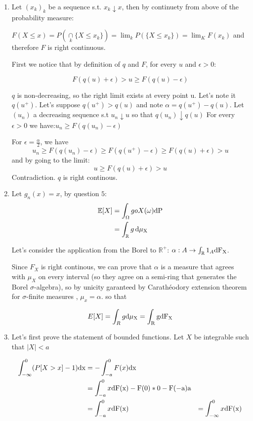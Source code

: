 \documentclass[12pt]{article}
\newcommand{\inter}[1]{\underset{#1}{\cap} }
\begin{document}
\begin{enumerate}
\item Let $(x_k)_k$ be a sequence s.t. $x_k \downarrow x$, then by continuety from above of the probability measure:

$F(X \leq x) = P( \inter{k}\{X \leq x_k\} ) = \lim_k P( \{X \leq x_k\} ) = \lim_K F(x_k)$ and therefore $F$ is right continuous.

First we notice that by definition of $q$ and $F$, for every $u$ and $\epsilon > 0$:

$$F(q(u)+\epsilon) > u \geq F(q(u) - \epsilon)$$

$q$ is non-decreasing, so the right limit exists at every point u. Let's note it $q(u^+)$. 
Let's suppose $q(u^+) > q(u)$ and note $\alpha = q(u^+) - q(u)$.
Let $(u_n)$ a decreasing sequence s.t $u_n \downarrow u$ so that $q(u_n) \downarrow q(u)$
For every $\epsilon > 0$ we have:$u_n \geq F(q(u_n) - \epsilon) $


For $\epsilon  = \frac{\alpha}2$, we have
$$u_n \geq F(q(u_n) - \epsilon) \geq F(q(u^+) - \epsilon) \geq F(q(u) + \epsilon) > u$$
and by going to the limit:
$$u \geq F(q(u)+\epsilon) > u$$
Contradiction. $q$ is right continous.


\item 

Let $g_n(x) = x$, by question $5$:
\begin{align*}
\mathbb{E}[X] &= \int_{\Omega} goX(\omega) \rm{d}P \\
&= \int_{\mathbb{R}} g \, \rm d \mu_{X}
\end{align*}


Let's consider the application from the Borel to $\mathbb{R}^+$: $\alpha: A \rightarrow \int_\mathbb{R} 1_A \rm dF_X$.

Since $F_X$ is right continous, we can prove that $\alpha$ is a measure that agrees with $\mu_X$ on every interval (so they agree on a semi-ring that generates the Borel $\sigma$-algebra), so by  unicity garanteed by Carathéodory extension theorem for $\sigma$-finite measures , $\mu_x = \alpha$. so that

$$E[X] = \int_R g \rm d \mu_X = \int_R g \rm d F_X$$



\item
Let's first prove the statement of bounded functions. Let $X$ be integrable such that $|X| < a$

\begin{align*}
\int_{-\infty}^0 (P[X > x] - 1) \rm dx 
&= -  \int_{-a}^0 F(x) \rm dx \\
&=  \int_{-a}^0 x \rm d F(x) - F(0)*0 - F(-a)a\\
&= \int_{-a}^0 x \rm d F(x) 
&= \int_{-\infty}^0 x \rm d F(x) 
\end{align*}



\end{enumerate}
\end{document}
